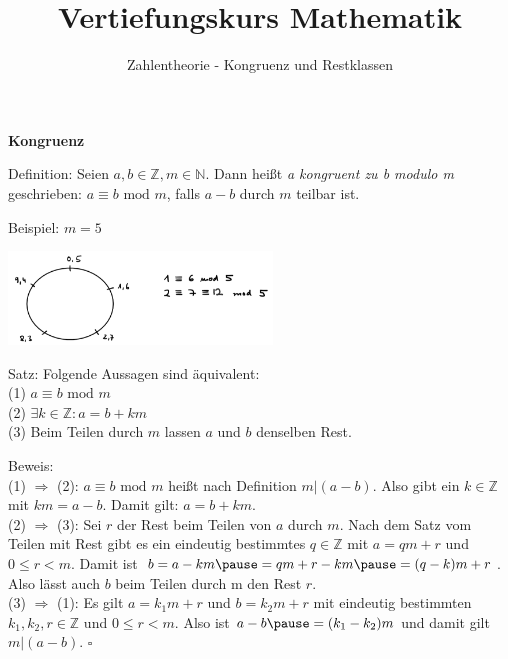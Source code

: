 \usepackage[ngerman]{babel}
\usepackage[utf8]{inputenc}
\usepackage{amsmath}
\usepackage{amssymb}
\usepackage{listings} 
\usepackage{stmaryrd}
\lstset{language=Python, tabsize=4, showstringspaces=false,basicstyle=\footnotesize,mathescape=true} 
\usepackage{mathtools}
\usepackage{ulem}
\usepackage{tikz}

\parskip 10pt
\newcommand{\ggT}{\operatorname{ggT}}
\newcommand{\Mod}[3]{#1\equiv#2\text{ mod }#3}
\newcommand{\tmod}{\text{ mod }}



\title{Vertiefungskurs Mathematik}   
\author{Zahlentheorie - Kongruenz und Restklassen} 
\date{}
\frame{\titlepage} 

\begin{frame}[fragile]

\textbf{Kongruenz}

Definition: Seien $a, b \in \mathbb{Z}, m \in \mathbb{N}$. Dann heißt \textit{a kongruent zu b modulo m} geschrieben: \quad 
\quad $\Mod{a}{b}{m}$, \quad 
 falls $a-b$ durch $m$ teilbar ist. \pause
 
 Beispiel: $m = 5$
 
 \includegraphics[width=7cm]{bild1.png}
\end{frame}

\begin{frame}[fragile]

Satz: Folgende Aussagen sind äquivalent: \\
(1)  $\Mod{a}{b}{m}$ \\
(2) $\exists k \in \mathbb{Z}: a = b+ km$ \\
(3) Beim Teilen durch $m$ lassen $a$ und $b$ denselben Rest. \pause

Beweis: \\
(1) $\Rightarrow$ (2): $\Mod{a}{b}{m}$ heißt nach Definition $m|(a-b)$. \pause
Also gibt ein $k \in \mathbb{Z}$ mit $k m = a - b.$ \pause Damit gilt: $a = b+ k  m$. \\ \pause
(2) $\Rightarrow$ (3): Sei $r$ der Rest beim Teilen von $a$ durch $m$. \pause Nach dem Satz vom Teilen mit Rest gibt es ein eindeutig bestimmtes $q \in \mathbb{Z}$ mit $a = q  m + r$ und $0 \le r < m$. \pause Damit ist  $b = a - km \pause = q m + r - km\pause =  (q - k)  m + r$. \pause Also lässt auch $b$ beim Teilen durch m den Rest $r$. \\ \pause 
(3) $\Rightarrow$ (1): \pause Es gilt $a = k_1  m + r$ und $b = k_2  m + r$ mit eindeutig bestimmten
$k_1, k_2,r  \in \mathbb{Z}$ und $0 \le r < m$. \pause Also ist $a-b \pause = (k_1-k_2)  m$ \pause und damit gilt $m|(a-b)$. \hfill $\square{}$

\end{frame}

